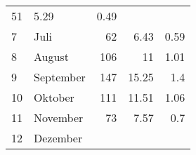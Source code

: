 \begin{longtable}{lXrrr}
       \num{51} &
       \num[round-mode=places,round-precision=2]{5,29} &
         \num[round-mode=places,round-precision=2]{0,49} \\

     7 &
     \multicolumn{1}{X}{ Juli   } &


       \num{62} &
       \num[round-mode=places,round-precision=2]{6,43} &
         \num[round-mode=places,round-precision=2]{0,59} \\

     8 &
     \multicolumn{1}{X}{ August   } &


       \num{106} &
       \num[round-mode=places,round-precision=2]{11} &
         \num[round-mode=places,round-precision=2]{1,01} \\

     9 &
     \multicolumn{1}{X}{ September   } &


       \num{147} &
       \num[round-mode=places,round-precision=2]{15,25} &
         \num[round-mode=places,round-precision=2]{1,4} \\

     10 &
     \multicolumn{1}{X}{ Oktober   } &


       \num{111} &
       \num[round-mode=places,round-precision=2]{11,51} &
         \num[round-mode=places,round-precision=2]{1,06} \\

     11 &
     \multicolumn{1}{X}{ November   } &


       \num{73} &
       \num[round-mode=places,round-precision=2]{7,57} &
         \num[round-mode=places,round-precision=2]{0,7} \\

     12 &
     \multicolumn{1}{X}{ Dezember   } &



\end{longtable}
